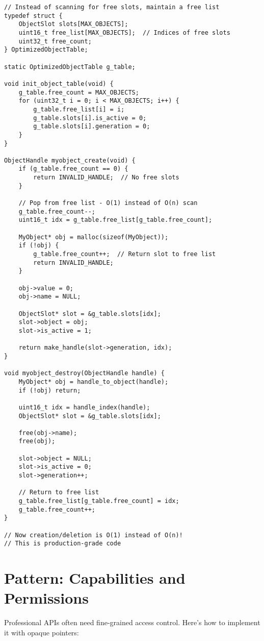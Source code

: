 \begin{lstlisting}
// Instead of scanning for free slots, maintain a free list
typedef struct {
    ObjectSlot slots[MAX_OBJECTS];
    uint16_t free_list[MAX_OBJECTS];  // Indices of free slots
    uint32_t free_count;
} OptimizedObjectTable;

static OptimizedObjectTable g_table;

void init_object_table(void) {
    g_table.free_count = MAX_OBJECTS;
    for (uint32_t i = 0; i < MAX_OBJECTS; i++) {
        g_table.free_list[i] = i;
        g_table.slots[i].is_active = 0;
        g_table.slots[i].generation = 0;
    }
}

ObjectHandle myobject_create(void) {
    if (g_table.free_count == 0) {
        return INVALID_HANDLE;  // No free slots
    }

    // Pop from free list - O(1) instead of O(n) scan
    g_table.free_count--;
    uint16_t idx = g_table.free_list[g_table.free_count];

    MyObject* obj = malloc(sizeof(MyObject));
    if (!obj) {
        g_table.free_count++;  // Return slot to free list
        return INVALID_HANDLE;
    }

    obj->value = 0;
    obj->name = NULL;

    ObjectSlot* slot = &g_table.slots[idx];
    slot->object = obj;
    slot->is_active = 1;

    return make_handle(slot->generation, idx);
}

void myobject_destroy(ObjectHandle handle) {
    MyObject* obj = handle_to_object(handle);
    if (!obj) return;

    uint16_t idx = handle_index(handle);
    ObjectSlot* slot = &g_table.slots[idx];

    free(obj->name);
    free(obj);

    slot->object = NULL;
    slot->is_active = 0;
    slot->generation++;

    // Return to free list
    g_table.free_list[g_table.free_count] = idx;
    g_table.free_count++;
}

// Now creation/deletion is O(1) instead of O(n)!
// This is production-grade code
\end{lstlisting}

\section{Pattern: Capabilities and Permissions}

Professional APIs often need fine-grained access control. Here's how to implement it with opaque pointers:

